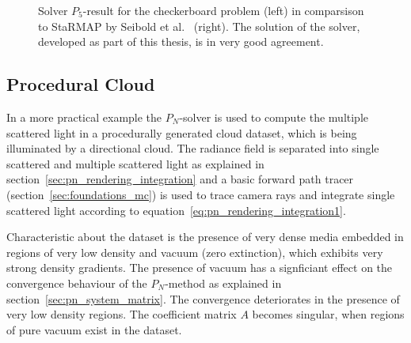 \begin{figure}[h]
\begin{subfigure}{0.49\columnwidth}
\end{subfigure}%
\caption{Solver $P_5$-result for the checkerboard problem (left) in comparsison to \textsf{StaRMAP} by Seibold et al.~\cite{Seibold14} (right). The solution of the solver, developed as part of this thesis, is in very good agreement.}
\label{fig:pn_results_checkerboard1}
\end{figure}

\subsection{Procedural Cloud}
\label{sec:pn_results_clouds}

In a more practical example the $P_N$-solver is used to compute the multiple scattered light in a procedurally generated cloud dataset, which is being illuminated by a directional cloud. The radiance field is separated into single scattered and multiple scattered light as explained in section~\ref{sec:pn_rendering_integration} and a basic forward path tracer (section~\ref{sec:foundations_mc}) is used to trace camera rays and integrate single scattered light according to equation~\ref{eq:pn_rendering_integration1}.

Characteristic about the dataset is the presence of very dense media embedded in regions of very low density and vacuum (zero extinction), which exhibits very strong density gradients. The presence of vacuum has a signficiant effect on the convergence behaviour of the $P_N$-method as explained in section~\ref{sec:pn_system_matrix}. The convergence deteriorates in the presence of very low density regions. The coefficient matrix $A$ becomes singular, when regions of pure vacuum exist in the dataset.

